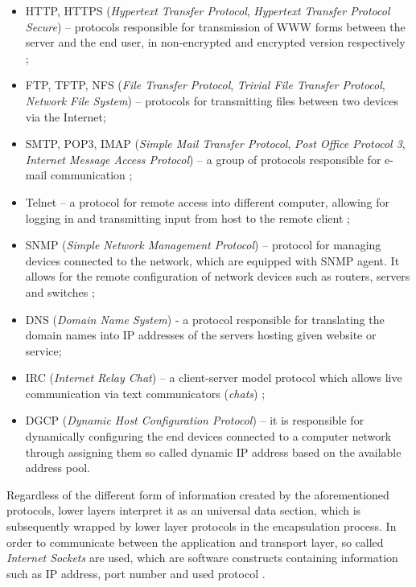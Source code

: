 \begin{itemize}
	\item [1)] HTTP, HTTPS (\emph{Hypertext Transfer Protocol}, \emph{Hypertext Transfer Protocol Secure}) -- protocols responsible for transmission of WWW forms between the server and the end user, in non-encrypted and encrypted version respectively \cite{http};
	\item [2)] FTP, TFTP, NFS (\emph{File Transfer Protocol}, \emph{Trivial File Transfer Protocol}, \emph{Network File System}) -- protocols for transmitting files between two devices via the Internet;
	\item [3)] SMTP, POP3, IMAP (\emph{Simple Mail Transfer Protocol}, \emph{Post Office Protocol 3}, \emph{Internet Message Access Protocol}) -- a group of protocols responsible for e-mail communication \cite{ibm:smtp}\cite{uci:pop3};
	\item [4)] Telnet -- a protocol for remote access into different computer, allowing for logging in and transmitting input from host to the remote client \cite{slownik:telnet};
	\item [5)] SNMP (\emph{Simple Network Management Protocol}) -- protocol for managing devices connected to the network, which are equipped with SNMP agent. It allows for the remote configuration of network devices such as routers, servers and switches \cite{ibm:snmp};
	\item [6)] DNS (\emph{Domain Name System}) - a protocol responsible for translating the domain names into IP addresses of the servers hosting given website or service;
	\item [7)] IRC (\emph{Internet Relay Chat}) -- a client-server model protocol which allows live communication via text communicators (\emph{chats}) \cite{irc};
	\item [8)] DGCP (\emph{Dynamic Host Configuration Protocol}) -- it is responsible for dynamically configuring the end devices connected to a computer network through assigning them so called dynamic IP address based on the available address pool.
\end{itemize}

Regardless of the different form of information created by the aforementioned protocols, lower layers interpret it as an universal data section, which is subsequently wrapped by lower layer protocols in the encapsulation process. In order to communicate between the application and transport layer, so called \emph{Internet Sockets} are used, which are software constructs containing information such as IP address, port number and used protocol \cite{tcpip:layers}.

